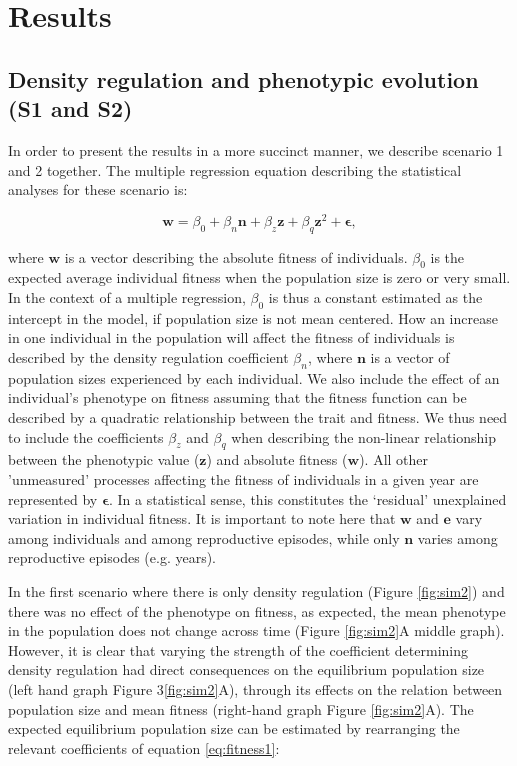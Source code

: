 \documentclass{article}
\begin{document}
\section{Results}

\subsection{Density regulation and phenotypic evolution (S1 and S2)}

In order to present the results in a more succinct manner, we describe scenario 1 and 2 together. The multiple regression equation describing the statistical analyses for these scenario is:

\begin{equation} \label{eq:fitness1}
\mathbf{w}=\beta_{0} +\beta_{n} \mathbf{n} + \beta_{z} \mathbf{z} + \beta_{q} \mathbf{z}^2 + \mathbf{\epsilon},
\end{equation}

\noindent where $\mathbf{w}$ is a vector describing the absolute fitness of individuals. $\beta_{0}$ is the expected average individual fitness when the population size is zero or very small. In the context of a multiple regression, $\beta_{0}$ is thus a constant estimated as the intercept in the model, if population size is not mean centered. How an increase in one individual in the population will affect the fitness of individuals is described by the density regulation coefficient $\beta_{n}$, where $\mathbf{n}$ is a vector of population sizes experienced by each individual. We also include the effect of an individual's phenotype on fitness assuming that the fitness function can be described by a quadratic relationship between the trait and fitness. We thus need to include the coefficients $\beta_{z}$ and $\beta_{q}$ when describing the non-linear relationship between the phenotypic value ($\mathbf{z}$) and absolute fitness ($\mathbf{w}$). All other 'unmeasured' processes affecting the fitness of individuals in a given year are represented by $ \mathbf{\epsilon}$. In a statistical sense, this constitutes the `residual' unexplained variation in individual fitness. It is important to note here that $\mathbf{w}$ and $\mathbf{e}$ vary among individuals and among reproductive episodes, while only $\mathbf{n}$ varies among reproductive episodes (e.g. years).

In the first scenario where there is only density regulation (Figure \ref{fig:sim2}) and there was no effect of the phenotype on fitness, as expected, the mean phenotype in the population does not change across time (Figure \ref{fig:sim2}A middle graph). However, it is clear that varying the strength of the coefficient determining density regulation had direct consequences on the equilibrium population size (left hand graph Figure 3\ref{fig:sim2}A), through its effects on the relation between population size and mean fitness (right-hand graph Figure \ref{fig:sim2}A). The expected equilibrium population size can be estimated by rearranging the relevant coefficients of equation \ref{eq:fitness1}:
\end{document}
